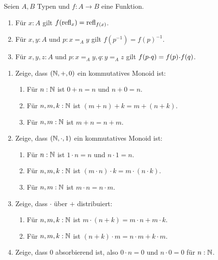 \documentclass{uebung}
\begin{document}

\begin{exercise}
  Seien $A,B$ Typen und $f:A\to B$ eine Funktion.
  \begin{enumerate}
    \item Für $x:A$ gilt $f(\mathrm{refl}_x)=\mathrm{refl}_{f(x)}$.
    \item Für $x,y:A$ und $p:x=_A y$ gilt $f(p^{-1})=f(p)^{-1}$.
    \item Für $x,y,z:A$ und $p:x=_A y, q:y=_A z$ gilt $f(p\kon q)=f(p)\kon f(q)$.
  \end{enumerate}
\end{exercise}

\begin{exercise}
  \begin{enumerate}
    \item Zeige, dass $(\mathbb{N},+,0)$ ein kommutatives Monoid ist:
      \begin{enumerate}
        \item Für $n:\mathbb{N}$ ist $0 + n = n$ und $n + 0 = n$.
        \item Für $n,m,k:\mathbb{N}$ ist $(m + n) + k = m + (n + k)$.
        \item Für $n,m:\mathbb{N}$ ist $m + n = n + m$.
      \end{enumerate}
    \item Zeige, dass $(\mathbb{N},\cdot,1)$ ein kommutatives Monoid ist:
      \begin{enumerate}
        \item Für $n:\mathbb{N}$ ist $1 \cdot n = n$ und $n \cdot 1 = n$.
        \item Für $n,m,k:\mathbb{N}$ ist $(m \cdot n) \cdot k = m \cdot (n \cdot k)$.
        \item Für $n,m:\mathbb{N}$ ist $m \cdot n = n \cdot m$.
      \end{enumerate}
    \item Zeige, dass $\cdot$ über $+$ distribuiert:
      \begin{enumerate}
        \item Für $n,m,k:\mathbb{N}$ ist $m \cdot (n + k) = m \cdot n + m \cdot k$.
        \item Für $n,m,k:\mathbb{N}$ ist $(n + k) \cdot m = n \cdot m + k \cdot m$.
      \end{enumerate}
    \item Zeige, dass $0$ absorbierend ist, also $0 \cdot n = 0$ und $n \cdot 0 = 0$ für $n:\mathbb{N}$.
  \end{enumerate}
\end{exercise}
\end{document}

